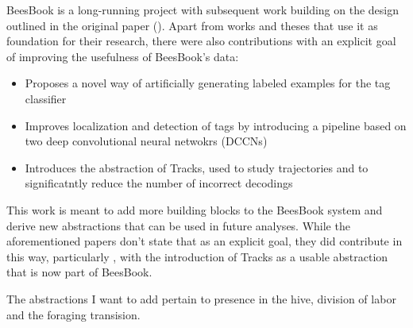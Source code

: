 BeesBook is a long-running project with subsequent work building on the design
outlined in the original paper (\cite{wario_automatic_2015}). Apart from works and theses that use it as foundation for their research, there were also contributions with an explicit goal of improving the usefulness of BeesBook's data:


\begin{itemize}
    \item\cite{sixt_rendergan:_2016} Proposes a novel way of artificially generating labeled examples for the tag classifier
    \item\cite{wild_automatic_2018} Improves localization and detection of tags by introducing a pipeline based on two deep convolutional neural netwokrs (DCCNs)
    \item\cite{boenisch_tracking_2018}  Introduces the abstraction of Tracks, used to study trajectories and to significatntly reduce the number of incorrect decodings
\end{itemize}


This work is meant to add more building blocks to the BeesBook system and derive new
abstractions that can be used in future analyses. While the aforementioned papers don't state that as an explicit goal, they did contribute in this way, particularly \cite{boenisch_tracking_2018}, with the introduction of Tracks as a usable abstraction that is now part of BeesBook.

The abstractions I want to add pertain to presence in the hive, division of labor and the foraging transision.







